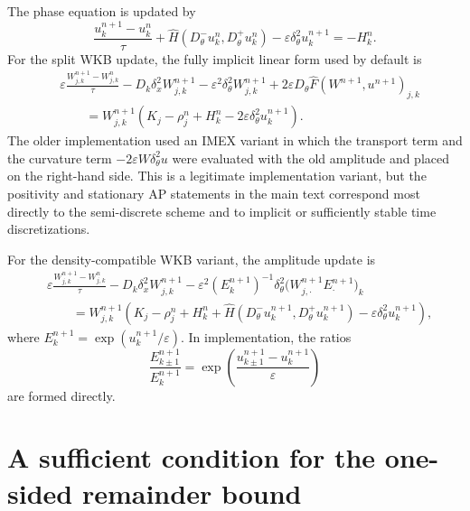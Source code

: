 \documentclass[11pt]{article}
\begin{document}
The phase equation is updated by
\begin{equation}\label{eq:fully_phase_new}
    \frac{u_k^{n+1}-u_k^n}{\tau}
    +\widehat H(D_\theta^-u_k^n,D_\theta^+u_k^n)
    -\varepsilon\delta_\theta^2u_k^{n+1}
    =-H_k^n.
\end{equation}
For the split WKB update, the fully implicit linear form used by default is
\begin{equation}\label{eq:fully_split_implicit_new}
\begin{aligned}
    &\varepsilon\frac{W_{j,k}^{n+1}-W_{j,k}^n}{\tau}
    -D_k\delta_x^2W_{j,k}^{n+1}
    -\varepsilon^2\delta_\theta^2W_{j,k}^{n+1}
    +2\varepsilon D_\theta\widehat F(W^{n+1},u^{n+1})_{j,k} \\
    &\qquad
    =W_{j,k}^{n+1}
    \left(K_j-\rho_j^n+H_k^n-2\varepsilon\delta_\theta^2u_k^{n+1}\right).
\end{aligned}
\end{equation}
The older implementation used an IMEX variant in which the transport term and the curvature term \(-2\varepsilon W\delta_\theta^2u\) were evaluated with the old amplitude and placed on the right-hand side.  This is a legitimate implementation variant, but the positivity and stationary AP statements in the main text correspond most directly to the semi-discrete scheme and to implicit or sufficiently stable time discretizations.

For the density-compatible WKB variant, the amplitude update is
\begin{equation}\label{eq:fully_dc_new}
\begin{aligned}
    &\varepsilon\frac{W_{j,k}^{n+1}-W_{j,k}^n}{\tau}
    -D_k\delta_x^2W_{j,k}^{n+1}
    -\varepsilon^2(E_k^{n+1})^{-1}
      \delta_\theta^2\bigl(W_{j,\cdot}^{n+1}E_{\cdot}^{n+1}\bigr)_k \\
    &\qquad
    =W_{j,k}^{n+1}
    \left(K_j-\rho_j^n+H_k^n
    +\widehat H(D_\theta^-u_k^{n+1},D_\theta^+u_k^{n+1})
    -\varepsilon\delta_\theta^2u_k^{n+1}\right),
\end{aligned}
\end{equation}
where \(E_k^{n+1}=\exp(u_k^{n+1}/\varepsilon)\).  In implementation, the ratios
\[
    \frac{E_{k\pm1}^{n+1}}{E_k^{n+1}}
    =\exp\left(\frac{u_{k\pm1}^{n+1}-u_k^{n+1}}{\varepsilon}\right)
\]
are formed directly.

\section{A sufficient condition for the one-sided remainder bound}\label{app:remainder}
\end{document}
